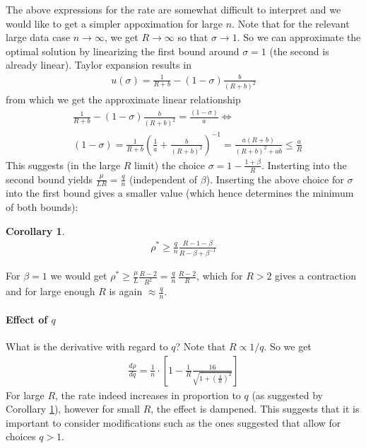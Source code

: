 \documentclass{article}
\newtheorem{corollary}{Corollary}
\begin{document}
The above expressions for the rate are somewhat difficult to interpret and we would like to get a simpler appoximation for large $n$. Note that for the relevant large data case $n \to \infty$, we get $R \to \infty$ so that $\sigma \to 1$. So we can approximate the optimal solution by linearizing the first bound around $\sigma=1$ (the second is already linear). Taylor expansion results in 
\begin{align}
u(\sigma)= \frac{1}{R + b} - (1-\sigma) \frac b {(R+b)^2}
\end{align}
from which we get the approximate linear relationship
\begin{align}
& \frac{1}{R + b} - (1-\sigma) \frac b {(R+b)^2} = \frac{(1-\sigma)}{a}  \iff \\
& (1-\sigma) = \frac{1}{R + b}   \left( \frac 1a +  \frac b {(R+b)^2} \right)^{-1}
=  \frac {a(R+b)}{(R+b)^2 + ab}  \le \frac aR
\end{align}
This suggests (in the large $R$ limit) the choice $\sigma  =1 - \frac {1+\beta}{R}$. Insterting into the second bound yields $ \frac \mu{LR} = \frac{q}{n}$ (independent of $\beta$). Inserting the above choice for $\sigma$ into the first bound gives a smaller value (which hence determines the minimum of both bounds):
\begin{corollary}
\begin{align}
\rho^* \ge \frac{q}{n} \frac{R- 1- \beta}{R - \beta +\beta^{-1}}
\label{eq:bound-param-beta} 
\end{align}
\label{corollary:largeR}
\end{corollary}
For $\beta=1$ we would get $\rho^* \ge \frac \mu L \frac{R-2}{R^2} = \frac qn \, \frac {R-2}{R}$, which for $R>2$ gives a contraction and for large enough $R$ is again $\approx \frac qn$. 

\paragraph{Effect of $q$}
What is the derivative with regard to $q$? Note that $R \propto 1/q$. So we get
\begin{align}
\frac{d \rho}{ dq} = \frac{1}{n}  \cdot \left[ 1 - \frac 1R \frac{16}{\sqrt{1+ \left( \frac{4}{R}\right)^2}} \right]
\end{align}
For large $R$, the rate indeed increases in proportion to $q$ (as suggested by Corollary \ref{corollary:largeR}), however for small $R$, the effect is dampened. This suggests that it is important to consider modifications such as the ones suggested that allow for choices $q>1$. 
\end{document}

